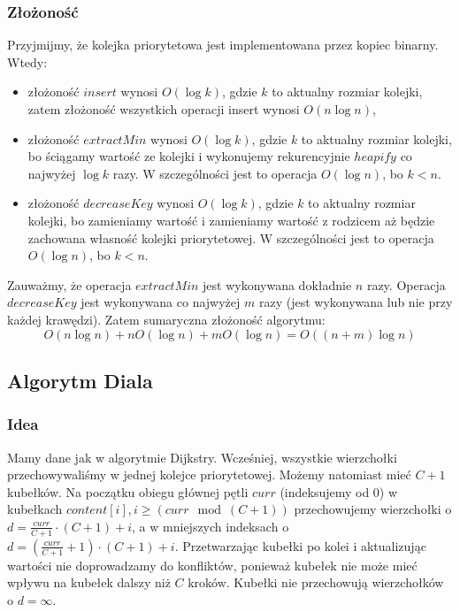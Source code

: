\documentclass{article}
\begin{document}
\subsubsection{Złożoność}
Przyjmijmy, że kolejka priorytetowa jest implementowana przez kopiec binarny. Wtedy:
\begin{itemize}
\item złożoność $insert$ wynosi $O(\log k)$, gdzie $k$ to aktualny rozmiar kolejki, zatem złożoność wszystkich operacji insert wynosi $O(n\log n)$,
\item złożoność $extractMin$ wynosi $O(\log k)$, gdzie $k$ to aktualny rozmiar kolejki, bo ściągamy wartość ze kolejki i wykonujemy rekurencyjnie $heapify$ co najwyżej $\log k$ razy. W szczególności jest to operacja $O(\log n)$, bo $k<n$.
\item złożoność $decreaseKey$ wynosi $O(\log k)$, gdzie $k$ to aktualny rozmiar kolejki, bo zamieniamy wartość i zamieniamy wartość z rodzicem aż będzie zachowana własność kolejki priorytetowej.  W szczególności jest to operacja $O(\log n)$, bo $k<n$.
\end{itemize}
Zauważmy, że operacja $extractMin$ jest wykonywana dokładnie $n$ razy. Operacja $decreaseKey$ jest wykonywana co najwyżej $m$ razy (jest wykonywana lub nie przy każdej krawędzi). Zatem sumaryczna złożoność algorytmu:
$$O(n\log n)+nO(\log n)+mO(\log n)=O((n+m)\log n)$$

\subsection{Algorytm Diala}
\subsubsection{Idea}
Mamy dane jak w algorytmie Dijkstry. Wcześniej, wszystkie wierzchołki przechowywaliśmy w jednej kolejce priorytetowej. Możemy natomiast mieć $C+1$ kubełków. Na początku obiegu głównej pętli $curr$ (indeksujemy od 0) w kubełkach $content[i],i\geq (curr \mod (C+1))$ przechowujemy wierzchołki o $d=\frac{curr}{C+1}\cdot (C+1)+i$, a w mniejszych indeksach o $d=(\frac{curr}{C+1}+1)\cdot (C+1)+i$.  Przetwarzając kubełki po kolei i aktualizując wartości nie doprowadzamy do konfliktów, ponieważ kubełek nie może mieć wpływu na kubełek dalszy niż $C$ kroków. Kubełki nie przechowują wierzchołków o $d=\infty$.
\end{document}

